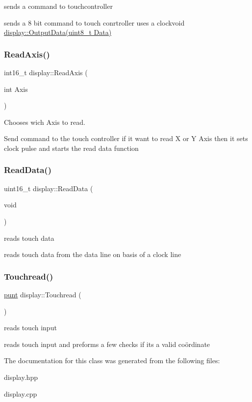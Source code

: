 sends a command to touchcontroller 

sends a 8 bit command to touch conrtroller uses a clockvoid \hyperlink{classdisplay_a3da84c7e17070441111af326cc03217a}{display\+::\+Output\+Data(uint8\+\_\+t Data)} \mbox{\label{classdisplay_ac198f10fa30850e9e3fa71b0dc0c1d73}} 
\subsubsection{\texorpdfstring{Read\+Axis()}{ReadAxis()}}
{\footnotesize\ttfamily int16\+\_\+t display\+::\+Read\+Axis (\begin{DoxyParamCaption}\item[{int}]{Axis }\end{DoxyParamCaption})}



Chooses wich Axis to read. 

Send command to the touch controller if it want to read X or Y Axis then it sets clock pulse and starts the read data function \mbox{\label{classdisplay_a701815d7bc53a0eea5f3fd2e020c36ae}} 
\subsubsection{\texorpdfstring{Read\+Data()}{ReadData()}}
{\footnotesize\ttfamily uint16\+\_\+t display\+::\+Read\+Data (\begin{DoxyParamCaption}\item[{void}]{ }\end{DoxyParamCaption})}



reads touch data 

reads touch data from the data line on basis of a clock line \mbox{\label{classdisplay_a7e3b873f8b5fbd55cbe65862c18374b3}} 
\subsubsection{\texorpdfstring{Touchread()}{Touchread()}}
{\footnotesize\ttfamily \hyperlink{classpunt}{punt} display\+::\+Touchread (\begin{DoxyParamCaption}{ }\end{DoxyParamCaption})}



reads touch input 

reads touch input and preforms a few checks if its a valid coördinate 

The documentation for this class was generated from the following files\+:\begin{DoxyCompactItemize}
\item 
display.\+hpp\item 
display.\+cpp\end{DoxyCompactItemize}
